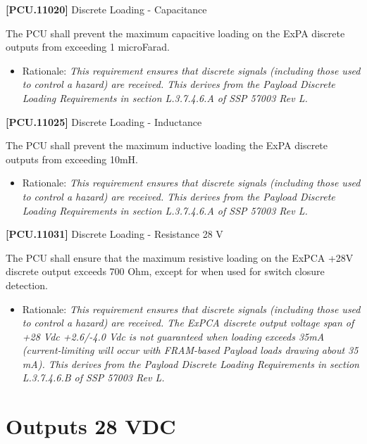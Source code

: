 \textbf{[PCU.11020]} Discrete Loading - Capacitance

The \gls{PCU} shall prevent the maximum capacitive loading on the \gls{ExPA} discrete outputs from exceeding 1 microFarad.

\begin{itemize}
\item{} Rationale: \emph{This requirement ensures that discrete signals (including those used to control a hazard) are received. This derives from the Payload Discrete Loading Requirements in section L.3.7.4.6.A of SSP 57003 Rev L.}

\end{itemize}

\textbf{[PCU.11025]} Discrete Loading - Inductance

The \gls{PCU} shall prevent the maximum inductive loading the \gls{ExPA} discrete outputs from exceeding 10mH.

\begin{itemize}
\item{} Rationale: \emph{This requirement ensures that discrete signals (including those used to control a hazard) are received. This derives from the Payload Discrete Loading Requirements in section L.3.7.4.6.A of SSP 57003 Rev L.}

\end{itemize}

\textbf{[PCU.11031]} Discrete Loading - Resistance 28 V

The \gls{PCU} shall ensure that the maximum resistive loading on the ExPCA +28V discrete output exceeds 700 Ohm, except for when used for switch closure detection.

\begin{itemize}
\item{} Rationale: \emph{This requirement ensures that discrete signals (including those used to control a hazard) are received. The ExPCA discrete output voltage span of +28 Vdc +2.6\slash -4.0 Vdc is not guaranteed when loading exceeds 35mA (current-limiting will occur with FRAM-based Payload loads drawing about 35 mA). This derives from the Payload Discrete Loading Requirements in section L.3.7.4.6.B of SSP 57003 Rev L.}

\end{itemize}

\section{Outputs 28 VDC}
\label{outputs28vdc}

